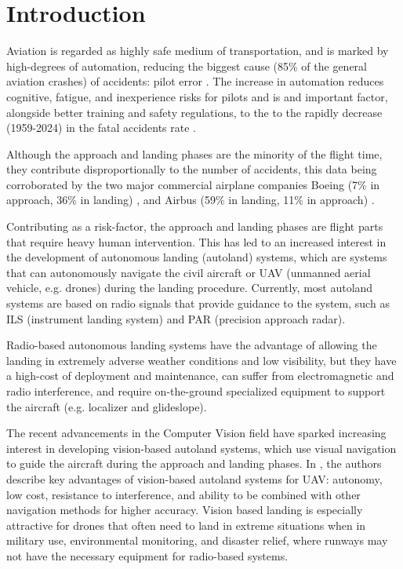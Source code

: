 \chapter{Introduction}\label{ch:introduction}
Aviation is regarded as highly safe medium of transportation, and is marked by high-degrees of automation, reducing the biggest cause (85\% of the general aviation crashes) of accidents: pilot error \cite{li_factors_2001}. The increase in automation reduces cognitive, fatigue, and inexperience risks for pilots and is and important factor, alongside better training and safety regulations, to the to the rapidly decrease (1959-2024) in the fatal accidents rate \cite{airbus_fatal_nodate}.

Although the approach and landing phases are the minority of the flight time, they contribute disproportionally to the number of accidents, this data being corroborated by the two major commercial airplane companies Boeing (7\% in approach, 36\% in landing) \cite{boeing_statistical_2024}, and Airbus (59\% in landing, 11\% in approach) \cite{airbus_accidents_nodate}.

Contributing as a risk-factor, the approach and landing phases are flight parts that require heavy human intervention. This has led to an increased interest in the development of autonomous landing (autoland) systems, which are systems that can autonomously navigate the civil aircraft or UAV (unmanned aerial vehicle, e.g. drones) during the landing procedure. Currently, most autoland systems are based on radio signals that provide guidance to the system, such as ILS (instrument landing system) and PAR (precision approach radar).

Radio-based autonomous landing systems have the advantage of allowing the landing in extremely adverse weather conditions and low visibility, but they have a high-cost of deployment and maintenance, can suffer from electromagnetic and radio interference, and require on-the-ground specialized equipment to support the aircraft (e.g. localizer and glideslope).

The recent advancements in the Computer Vision field have sparked increasing interest \cite{airbus_airbus_2021} in developing vision-based autoland systems, which use visual navigation to guide the aircraft during the approach and landing phases. In \cite{xin_vision-based_2022}, the authors describe key advantages of vision-based autoland systems for UAV: autonomy, low cost, resistance to interference, and ability to be combined with other navigation methods for higher accuracy. Vision based landing is especially attractive for drones that often need to land in extreme situations when in military use, environmental monitoring, and disaster relief, where runways may not have the necessary equipment for radio-based systems.

